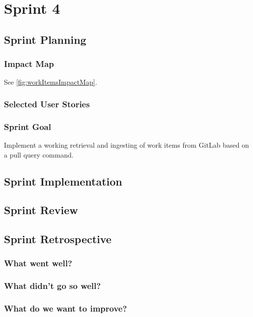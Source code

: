 \section{Sprint 4}

\subsection{Sprint Planning}

\subsubsection{Impact Map}

See \ref{fig:workItemsImpactMap}. 

\subsubsection{Selected User Stories}

\subsubsection{Sprint Goal}

Implement a working retrieval and ingesting of work items from GitLab based on a pull query command.

\subsection{Sprint Implementation}

\subsection{Sprint Review}

\subsection{Sprint Retrospective}

\subsubsection{What went well?}

\subsubsection{What didn't go so well?}

\subsubsection{What do we want to improve?}